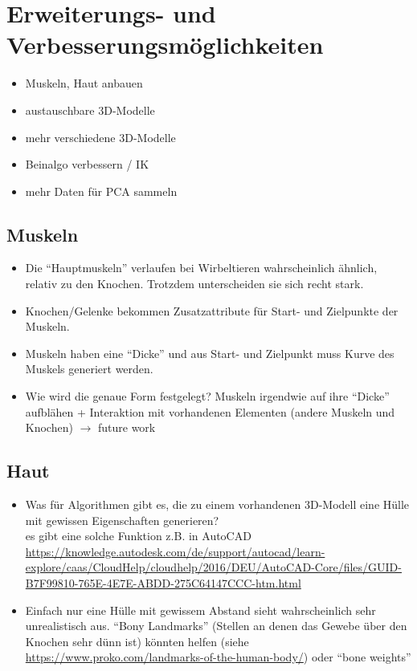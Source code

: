 \chapter{Erweiterungs- und Verbesserungsmöglichkeiten}

\begin{itemize}
 \item Muskeln, Haut \etc anbauen
 \item austauschbare 3D-Modelle
 \item mehr verschiedene 3D-Modelle
 \item Beinalgo verbessern / IK
 \item mehr Daten für PCA sammeln
\end{itemize}


\section{Muskeln}

\begin{itemize}
 \item Die "`Hauptmuskeln"' verlaufen bei Wirbeltieren wahrscheinlich ähnlich, relativ zu den Knochen. Trotzdem unterscheiden sie sich recht stark.
 \item Knochen/Gelenke bekommen Zusatzattribute für Start- und Zielpunkte der Muskeln.
 \item Muskeln haben eine "`Dicke"' und aus Start- und Zielpunkt muss Kurve des Muskels generiert werden.
 \item Wie wird die genaue Form festgelegt? Muskeln irgendwie auf ihre "`Dicke"' aufblähen + Interaktion mit vorhandenen Elementen (andere Muskeln und Knochen) $\rightarrow$ future work
\end{itemize}

\section{Haut}

\begin{itemize}
 \item Was für Algorithmen gibt es, die zu einem vorhandenen 3D-Modell eine Hülle mit gewissen Eigenschaften generieren? \\
 es gibt eine solche Funktion z.B. in AutoCAD \url{https://knowledge.autodesk.com/de/support/autocad/learn-explore/caas/CloudHelp/cloudhelp/2016/DEU/AutoCAD-Core/files/GUID-B7F99810-765E-4E7E-ABDD-275C64147CCC-htm.html}
 \item Einfach nur eine Hülle mit gewissem Abstand sieht wahrscheinlich sehr unrealistisch aus. "`Bony Landmarks"' (Stellen an denen das Gewebe über den Knochen sehr dünn ist) könnten helfen (siehe \url{https://www.proko.com/landmarks-of-the-human-body/}) oder "`bone weights"'
\end{itemize}
